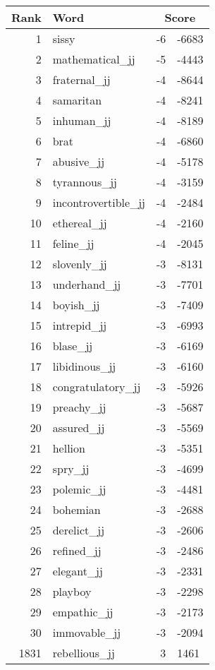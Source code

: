 \begin{longtable}[!htbp]{| rlr@{.}l |}
    \hline
    \textbf{Rank} & \textbf{Word} & \multicolumn{2}{c|}{\textbf{Score}} \\
    \hline
    \endhead
    1 & sissy & -6 & -6683 \\
    2 & mathematical\_jj & -5 & -4443 \\
    3 & fraternal\_jj & -4 & -8644 \\
    4 & samaritan & -4 & -8241 \\
    5 & inhuman\_jj & -4 & -8189 \\
    6 & brat & -4 & -6860 \\
    7 & abusive\_jj & -4 & -5178 \\
    8 & tyrannous\_jj & -4 & -3159 \\
    9 & incontrovertible\_jj & -4 & -2484 \\
    10 & ethereal\_jj & -4 & -2160 \\
    11 & feline\_jj & -4 & -2045 \\
    12 & slovenly\_jj & -3 & -8131 \\
    13 & underhand\_jj & -3 & -7701 \\
    14 & boyish\_jj & -3 & -7409 \\
    15 & intrepid\_jj & -3 & -6993 \\
    16 & blase\_jj & -3 & -6169 \\
    17 & libidinous\_jj & -3 & -6160 \\
    18 & congratulatory\_jj & -3 & -5926 \\
    19 & preachy\_jj & -3 & -5687 \\
    20 & assured\_jj & -3 & -5569 \\
    21 & hellion & -3 & -5351 \\
    22 & spry\_jj & -3 & -4699 \\
    23 & polemic\_jj & -3 & -4481 \\
    24 & bohemian & -3 & -2688 \\
    25 & derelict\_jj & -3 & -2606 \\
    26 & refined\_jj & -3 & -2486 \\
    27 & elegant\_jj & -3 & -2331 \\
    28 & playboy & -3 & -2298 \\
    29 & empathic\_jj & -3 & -2173 \\
    30 & immovable\_jj & -3 & -2094 \\
    1831 & rebellious\_jj & 3 & 1461 \\

\end{longtable}
